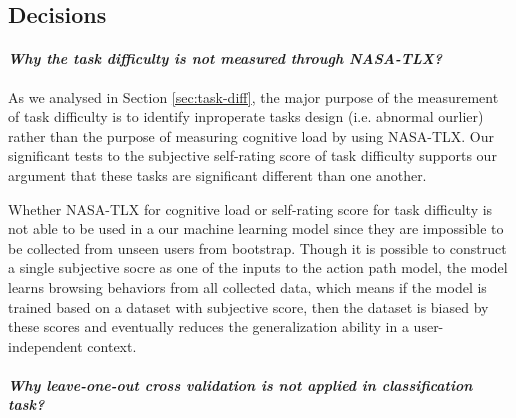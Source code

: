 \subsection{Decisions}

\paragraph{\emph{Why the task difficulty is not measured through NASA-TLX?}}

As we analysed in Section \ref{sec:task-diff}, the major purpose of the measurement of 
task difficulty is to identify inproperate tasks design (i.e. abnormal ourlier) 
rather than the purpose of measuring cognitive load by using NASA-TLX.
Our significant tests to the subjective self-rating score of task difficulty supports
our argument that these tasks are significant different than one another.

Whether NASA-TLX for cognitive load or self-rating score for task difficulty is not able to be used in
a our machine learning model since they are impossible to be collected from unseen users from bootstrap.
Though it is possible to construct a single subjective socre as one of the inputs to the action path model,
the model learns browsing behaviors from all collected data, which means if the model is trained based on 
a dataset with subjective score, then the dataset is biased by these scores and eventually reduces the 
generalization ability in a user-independent context.

\paragraph{\emph{Why leave-one-out cross validation is not applied in classification task?}}

